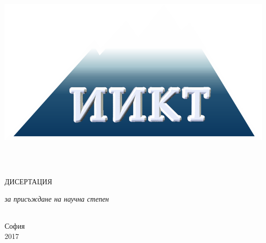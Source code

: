 \documentclass[12pt,bulgarian,singlespacing,headsepline,oneside,openany]{IICTBASDoctoralThesis}
\author{\href{http://www.linkedin.com/in/todor-balabanov-2805393}{д-р инж. Тодор Димитров \textsc{Балабанов}}}
\begin{document}
\frontmatter

\pagestyle{plain}


\begin{titlepage}
\begin{center}

\vspace*{.01\textheight}

{\scshape \LARGE \univname \\[0.5cm] 
\includegraphics[width=0.1\linewidth]{logo-iict-bg}
\facname \\[0.5cm] 
\deptname \par}\vspace{1.5cm}
 
\authorname

\HRule \\[0.4cm]

{\huge \bfseries \ttitle \par}\vspace{0.4cm}

\HRule \\[1.5cm]

\textsc{\Large ДИСЕРТАЦИЯ}\\[0.5cm] 
 
\vfill

\large \textit{за присъждане на научна степен\\ \degreename}\\[1.3cm]

\subjectname \vspace{1.5cm}
 
\vfill
 
{\large София \\ 2017}
 
\vfill
\end{center}
\end{titlepage}
\end{document}

